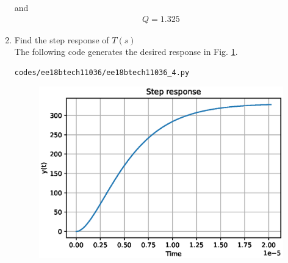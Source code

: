 \begin{enumerate}[label=\arabic*.,ref=\theenumi]

%
and 
\begin{align}
    Q=1.325
    \label{eq:ee18btech11036_Q_new2}
\end{align}

\item Find the step response of $T(s)$
\\
\solution The following code generates the desired response  in Fig. \ref{fig:ee18btech11036_ee18btech11036_4}.
\begin{lstlisting}
codes/ee18btech11036/ee18btech11036_4.py
\end{lstlisting}
%
\begin{figure}[!ht]
\centering
\includegraphics[width=\columnwidth]{./figs/ee18btech11036/ee18btech11036_4.eps}
\caption{}
\label{fig:ee18btech11036_ee18btech11036_4}
\end{figure}




\end{enumerate}
